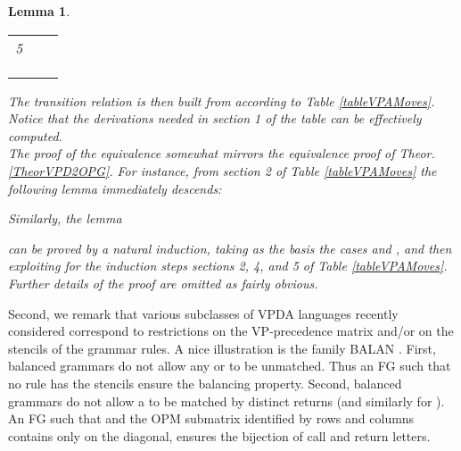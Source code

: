 \documentclass[3p,11pt]{elsarticle}
\newtheorem{lemma}[theorem]{Lemma}
\newenvironment{proof}[1][Proof]{\begin{trivlist}
\item[\hskip \labelsep {\bfseries #1}]}{\end{trivlist}}
\begin{document}
\begin{lemma}
\begin{proof}
\begin{table}[h!]
\begin{center}
\begin{tabular}{|l|p{4cm}|p{5cm}|}
                  && 
  \\
  \hline
  5&  & 
  \\
                  && 
  \\
  &   & 
  \\
                  && 
  \\  \hline
\end{tabular}
\end{center}
\end{table}
The transition relation  is then built from  according to Table \ref{tableVPAMoves}. Notice that the derivations  needed in section 1 of the table can be effectively computed.
\\
The proof of the equivalence  somewhat mirrors the equivalence proof of Theor. \ref{TheorVPD2OPG}. For instance, from  section 2 of Table \ref{tableVPAMoves} the following lemma immediately descends:

Similarly, the lemma

can be proved by a natural induction, taking as the basis the cases  and , and then exploiting for the induction steps sections 2, 4, and 5  of Table \ref{tableVPAMoves}. Further details of the proof are omitted as fairly obvious.
\end{proof}
\end{lemma}
Second, we remark that various subclasses of VPDA languages recently considered correspond to restrictions on the VP-precedence matrix and/or on the stencils of the grammar rules. A nice illustration is the family BALAN \cite{Berstel:2001:BGT}. First, balanced grammars do not allow  any  or  to be unmatched. Thus an FG such that no rule has the stencils  ensure the balancing property. Second, balanced grammars do not allow a  to be matched by distinct returns  (and similarly for ). An FG such that  and the OPM submatrix identified by rows  and columns  contains  only on the diagonal, ensures the bijection of call and return letters.
\end{document}
